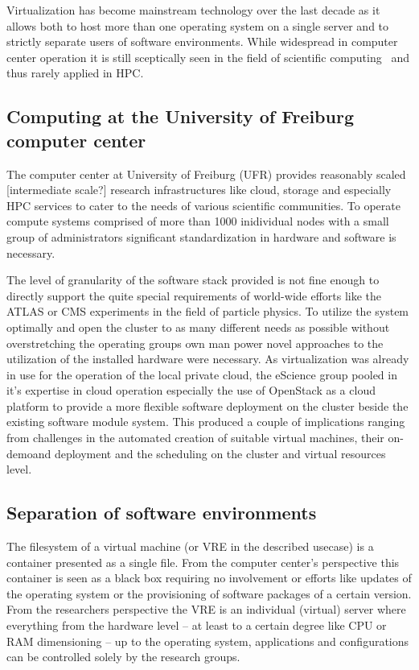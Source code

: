 Virtualization has become mainstream technology over the last decade as it allows
both to host more than one operating system on a single server and to strictly
separate users of software environments. While widespread in computer center
operation it is still sceptically seen in the field of scientific computing~\cite{VirtualisationScientificComp} and
thus rarely applied in HPC.

\subsection{Computing at the University of Freiburg computer center}

The computer center at University of Freiburg (UFR) provides
reasonably scaled [intermediate scale?] research
infrastructures like cloud, storage and especially HPC services to cater to the
needs of various scientific communities. To operate compute systems comprised of
more than 1000 inidividual nodes with a small group of administrators
significant standardization in hardware and software is necessary.

The level of granularity of the software stack provided is not fine enough to
directly support the quite special requirements of world-wide efforts like the
ATLAS or CMS experiments in the field of particle physics. To utilize the system
optimally and open the cluster to as many different needs as possible without
overstretching the operating groups own man power novel approaches to the
utilization of the installed hardware were necessary. As virtualization was
already in use for the operation of the local private cloud, the eScience group
pooled in it's expertise in cloud operation especially the use of OpenStack as a
cloud platform to provide a more flexible software deployment on the cluster
beside the existing software module system. This produced a couple of
implications ranging from challenges in the automated creation of suitable
virtual machines, their on-demoand deployment and the scheduling on the cluster
and virtual resources level.

\subsection{Separation of software environments}

The filesystem of a virtual machine (or VRE in the described usecase) is a
container presented as a single file. From the computer center's perspective
this container is seen as a black box requiring no involvement or efforts like
updates of the operating system or the provisioning of software packages of a
certain version. From the researchers perspective the VRE is an individual
(virtual) server where everything from the hardware level -- at least to a
certain degree like CPU or RAM dimensioning -- up to the operating system,
applications and configurations can be controlled solely by the research groups.

